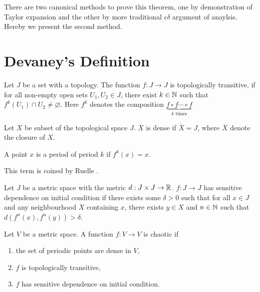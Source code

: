 There are two canonical methods to prove this theorem, one by demonstration of Taylor expansion and the other by more traditional $\epsilon \delta$ argument of anaylsis.
Hereby we present the second method.


\section{Devaney's Definition}

\begin{defn}
	Let $J$ be a set with a topology.
	The function $f: J \rightarrow J$ is topologically transitive, if for all non-empty open sets $U_1, U_2 \in J$, there exist $k \in \mathbb{N}$ such that $f^k(U_1) \cap U_2 \neq \varnothing$. 
	Here $f^k$ denotes the composition $\underbrace{f \circ f \cdots \circ f}_{k \text{ times}}$
\end{defn}

\begin{defn}[Dense]
	Let $X$ be subset of the topological space $J$. 
	$X$ is dense if $\overline{X} = J$, where $\overline{X}$ denote the closure of $X$.
\end{defn}

\begin{defn}
	A point $x$ is a period of period $k$ if $f^k(x)=x$.
\end{defn}

\begin{defn}
	This term is coined by Ruelle \cite{Ruelle-1978}.

	Let $J$ be a metric space with the metric $d: J \times J \rightarrow \mathbb{R}$.
	$f: J \rightarrow J$ has sensitive dependence on initial condition if there exists some $\delta > 0$ such that for all $x \in J$ and any neighbourhood $X$ containing $x$, there exists $y \in X$ and $n \in \mathbb{N}$ such that $d(f^n(x), f^n(y)) > \delta$.
\end{defn}

\begin{defn}\label{def:Devaney_definition_for_chaos}
	Let $V$ be a metric space.
	A function $f: V \rightarrow V$ is chaotic if 
	\begin{enumerate}
		\item the set of periodic points are dense in $V$,
		\item $f$ is topologically transitive,
		\item $f$ has sensitive dependence on initial condition. 
	\end{enumerate}
	
\end{defn}


